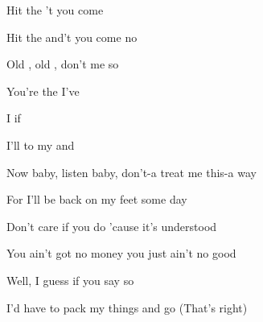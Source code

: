 
\zr
Hit the   't you come 

   

Hit the   and't you come  no    

\kr
\zs

Old , old , don't  me so 

You're the   I've  

I  if   

I'll  to  my  and 

\ks
\zr
\kr
\zs

Now baby, listen baby, don't-a treat me this-a way

For I'll be back on my feet some day

Don't care if you do 'cause it's understood

You ain't got no money you just ain't no good


Well, I guess if you say so

I'd have to pack my things and go (That's right)

\ks

\zr
\kr

\zr
\kr

\kp


